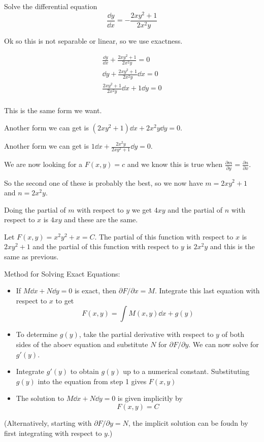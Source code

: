 \documentclass[../diffeq.tex]{subfiles}
\begin{document}
\pagebreak
\begin{example}
    Solve the differential equation 
    \[ \frac{\dd y}{\dd x}=-\frac{2xy^2+1}{2x^2y}\]

    Ok so this is not separable or linear, so we use exactness.

    \begin{align*}
        \frac{\dd y}{\dd x}+\frac{2xy^2+1}{2x^2y}=0 \\ 
        \dd y + \frac{2xy^2+1}{2x^2y}\dd x = 0\\
        \frac{2xy^2+1}{2x^2y}\dd x + 1 \dd y = 0 \\ 
    \end{align*}

    This is the same form we want. 

    Another form we can get is $(2xy^2+1)\dd x + 2x^2y\dd y =0$.

    Another form we can get is $1\dd x+\frac{2x^2y}{2xy^2+1}\dd y =0$.

    We are now looking for a $F(x,y)=c$ and we know this is true when $\frac{\partial m}{\partial y}=\frac{\partial n}{\partial x}$.

    So the second one of these is probably the best, so we now have $m=2xy^2+1$ and $n=2x^2y$. 

    Doing the partial of $m$ with respect to $y$ we get $4xy$ and the partial of $n$ with respect to $x$ is $4xy$ and these are the same.

    Let $F(x,y)=x^2y^2+x=C$. The partial of this function with respect to $x$ is $2xy^2+1$ and the partial of this function with respect to $y$ is $2x^2y$ and this is the same as previous.
\end{example}

Method for Solving Exact Equations:
\begin{itemize}
    \item If $M\dd x+N\dd y =0$ is exact, then $\partial F/\partial x=M$. Integrate this last equation with respect to $x$ to get 
    \[ F(x,y)=\int M(x,y)\dd x + g(y)\]
    \item To determine $g(y)$, take the partial derivative with respect to $y$ of both sides of the aboev equation and substitute $N$ for $\partial F/\partial y$. We can now solve for $g'(y)$.
    \item Integrate $g'(y)$ to obtain $g(y)$ up to a numerical constant. Substituting $g(y)$ into the equation from step 1 gives $F(x,y)$
    \item The solution to $M\dd x+N\dd y = 0$ is given implicitly by 
    \[ F(x,y)=C \]
\end{itemize}
(Alternatively, starting with $\partial F/\partial y=N$, the implicit solution can be foudn by first integrating with respect to $y$.)
\end{document}
